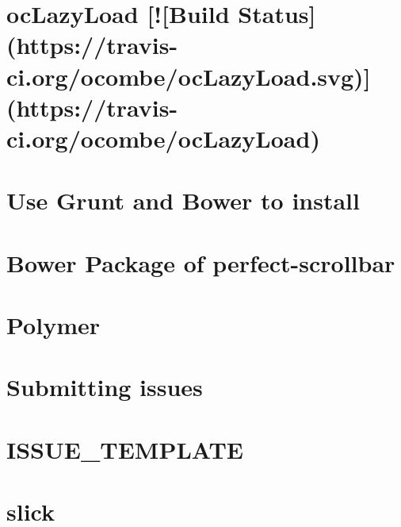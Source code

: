 \documentclass[twoside]{book}
\newcommand{\+}{\discretionary{\mbox{\scriptsize$\hookleftarrow$}}{}{}}
\begin{document}
\chapter{oc\+Lazy\+Load \mbox{[}!\mbox{[}Build Status\mbox{]}(https\+://travis-\/ci.org/ocombe/oc\+Lazy\+Load.svg)\mbox{]}(https\+://travis-\/ci.org/ocombe/oc\+Lazy\+Load)}
\label{md_app_web_bower_components_oclazyload__r_e_a_d_m_e}

\chapter{Use Grunt and Bower to install}
\label{md_app_web_bower_components__packet__r_e_a_d_m_e}

\chapter{Bower Package of perfect-\/scrollbar}
\label{md_app_web_bower_components_perfect-scrollbar__r_e_a_d_m_e}

\chapter{Polymer}
\label{md_app_web_bower_components_polymer__r_e_a_d_m_e}

\chapter{Submitting issues}
\label{md_app_web_bower_components_slick-carousel__c_o_n_t_r_i_b_u_t_i_n_g}

\chapter{I\+S\+S\+U\+E\+\_\+\+T\+E\+M\+P\+L\+A\+TE}
\label{md_app_web_bower_components_slick-carousel__i_s_s_u_e__t_e_m_p_l_a_t_e}

\chapter{slick}
\label{md_app_web_bower_components_slick-carousel__r_e_a_d_m_e}

\end{document}
